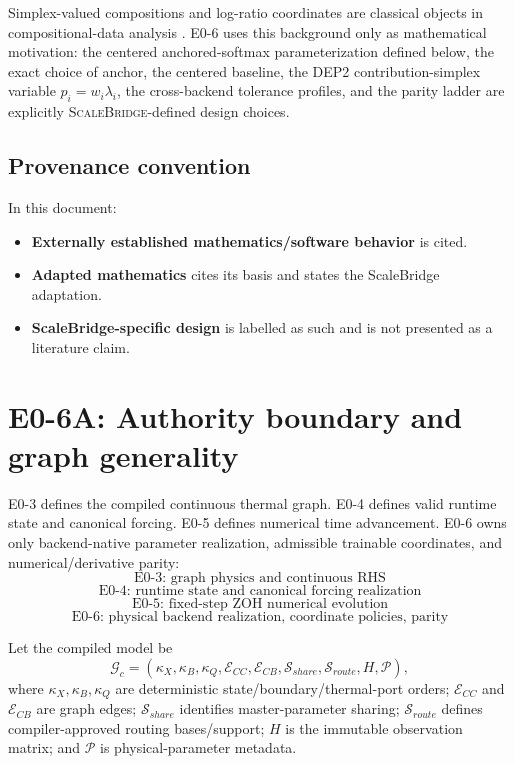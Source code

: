 \documentclass[11pt]{article}
\newcommand{\SB}{\textsc{ScaleBridge}}
\begin{document}
Simplex-valued compositions and log-ratio coordinates are classical objects in
compositional-data analysis \cite{Aitchison1982Compositional}. E0-6 uses this
background only as mathematical motivation: the centered anchored-softmax
parameterization defined below, the exact choice of anchor, the centered
baseline, the DEP2 contribution-simplex variable $p_i=w_i\lambda_i$, the
cross-backend tolerance profiles, and the parity ladder are explicitly
\SB{}-defined design choices.

\subsection*{Provenance convention}
In this document:
\begin{itemize}[leftmargin=*]
\item \textbf{Externally established mathematics/software behavior} is cited.
\item \textbf{Adapted mathematics} cites its basis and states the ScaleBridge
adaptation.
\item \textbf{ScaleBridge-specific design} is labelled as such and is not
presented as a literature claim.
\end{itemize}

\section{E0-6A: Authority boundary and graph generality}

E0-3 defines the compiled continuous thermal graph. E0-4 defines valid runtime
state and canonical forcing. E0-5 defines numerical time advancement. E0-6 owns
only backend-native parameter realization, admissible trainable coordinates,
and numerical/derivative parity:
\[
\boxed{\text{E0-3: graph physics and continuous RHS}}
\]
\[
\boxed{\text{E0-4: runtime state and canonical forcing realization}}
\]
\[
\boxed{\text{E0-5: fixed-step ZOH numerical evolution}}
\]
\[
\boxed{\text{E0-6: physical backend realization, coordinate policies, parity}}
\]

Let the compiled model be
\[
\mathcal G_c=
(\kappa_X,\kappa_B,\kappa_Q,
\mathcal E_{CC},\mathcal E_{CB},
\mathcal S_{share},\mathcal S_{route},H,\mathcal P),
\]
where $\kappa_X,\kappa_B,\kappa_Q$ are deterministic state/boundary/thermal-port
orders; $\mathcal E_{CC}$ and $\mathcal E_{CB}$ are graph edges;
$\mathcal S_{share}$ identifies master-parameter sharing; $\mathcal S_{route}$
defines compiler-approved routing bases/support; $H$ is the immutable observation
matrix; and $\mathcal P$ is physical-parameter metadata.
\end{document}
